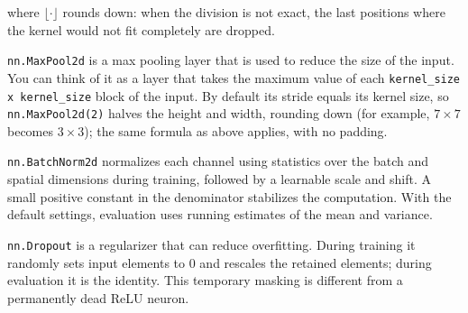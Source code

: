 \documentclass[11pt]{exam}
\begin{document}
where $\lfloor \cdot \rfloor$ rounds down: when the division is not exact, the last positions where the kernel would not fit completely are dropped.

\verb|nn.MaxPool2d| is a max pooling layer that is used to reduce the size of the input. You can think of it as a layer that takes the maximum value of each \verb|kernel_size x kernel_size| block of the input. By default its stride equals its kernel size, so \verb|nn.MaxPool2d(2)| halves the height and width, rounding down (for example, $7 \times 7$ becomes $3 \times 3$); the same formula as above applies, with no padding.

\verb|nn.BatchNorm2d| normalizes each channel using statistics over the batch and spatial dimensions during training, followed by a learnable scale and shift. A small positive constant in the denominator stabilizes the computation. With the default settings, evaluation uses running estimates of the mean and variance.

\verb|nn.Dropout| is a regularizer that can reduce overfitting. During training it randomly sets input elements to 0 and rescales the retained elements; during evaluation it is the identity. This temporary masking is different from a permanently dead ReLU neuron.
\end{document}
